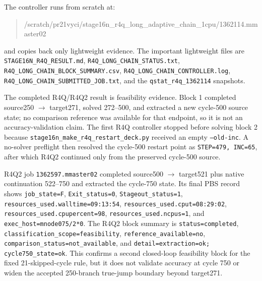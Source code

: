 \documentclass[11pt,a4paper]{article}
\newcommand{\code}[1]{\texttt{#1}}
\begin{document}
The controller runs from scratch at:
\begin{quote}\footnotesize\ttfamily
/scratch/pr21vyci/stage16n\_r4q\_long\_adaptive\_chain\_1cpu/1362114.mmaster02
\end{quote}
and copies back only lightweight evidence. The important lightweight files are \code{STAGE16N\_R4Q\_RESULT.md}, \code{R4Q\_LONG\_CHAIN\_STATUS.txt}, \code{R4Q\_LONG\_CHAIN\_BLOCK\_SUMMARY.csv}, \code{R4Q\_LONG\_CHAIN\_CONTROLLER.log}, \code{R4Q\_LONG\_CHAIN\_SUBMITTED\_JOB.txt}, and the \code{qstat\_r4q\_1362114} snapshots.

The completed R4Q/R4Q2 result is feasibility evidence. Block 1 completed source250 \(\rightarrow\) target271, solved 272--500, and extracted a new cycle-500 source state; no comparison reference was available for that endpoint, so it is not an accuracy-validation claim. The first R4Q controller stopped before solving block 2 because \code{stage16n\_make\_r4q\_restart\_deck.py} received an empty \code{--old-inc}. A no-solver preflight then resolved the cycle-500 restart point as \code{STEP=479, INC=65}, after which R4Q2 continued only from the preserved cycle-500 source.

R4Q2 job \code{1362597.mmaster02} completed source500 \(\rightarrow\) target521 plus native continuation 522--750 and extracted the cycle-750 state. Its final PBS record shows \code{job\_state=F}, \code{Exit\_status=0}, \code{Stageout\_status=1}, \code{resources\_used.walltime=09:13:54}, \code{resources\_used.cput=08:29:02}, \code{resources\_used.cpupercent=98}, \code{resources\_used.ncpus=1}, and \code{exec\_host=mnode075/2*0}. The R4Q2 block summary is \code{status=completed}, \code{classification\_scope=feasibility}, \code{reference\_available=no}, \code{comparison\_status=not\_available}, and \code{detail=extraction=ok; cycle750\_state=ok}. This confirms a second closed-loop feasibility block for the fixed 21-skipped-cycle rule, but it does not validate accuracy at cycle 750 or widen the accepted 250-branch true-jump boundary beyond target271.
\end{document}
